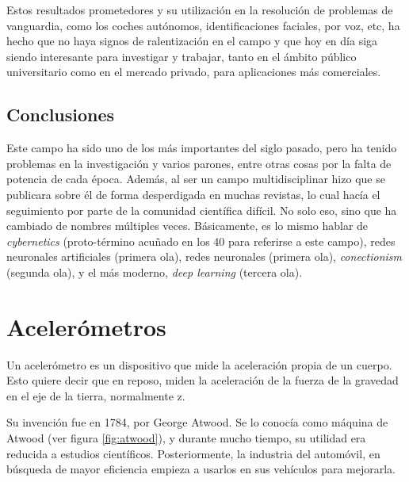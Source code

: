 \documentclass[12pt]{book}
\numberwithin{equation}{section}
\begin{document}
Estos resultados prometedores y su utilización en la resolución de problemas de vanguardia, como los coches autónomos, identificaciones faciales, por voz, etc,  ha hecho que no haya signos de ralentización en el campo y que hoy en día siga siendo interesante para investigar y trabajar, tanto en el ámbito público universitario como en el mercado privado, para aplicaciones más comerciales.


\subsection{Conclusiones}

Este campo ha sido uno de los más importantes del siglo pasado, pero ha tenido problemas en la investigación y varios parones, entre otras cosas por la falta de potencia de cada época. Además, al ser un campo multidisciplinar hizo que se publicara sobre él de forma desperdigada en muchas revistas, lo cual hacía el seguimiento por parte de la comunidad científica difícil. No solo eso, sino que ha cambiado de nombres múltiples veces. Básicamente, es lo mismo hablar de \textit{cybernetics} (proto-término acuñado en los 40 para referirse a este campo), redes neuronales artificiales (primera ola), redes neuronales (primera ola), \textit{conectionism} (segunda ola), y el más moderno, \textit{deep learning} (tercera ola).

\section{Acelerómetros}

Un acelerómetro es un dispositivo que mide la aceleración propia de un cuerpo. Esto quiere decir que en reposo, miden la aceleración de la fuerza de la gravedad en el eje de la tierra, normalmente z.

Su invención fue en 1784, por George Atwood. Se lo conocía como máquina de Atwood (ver figura \ref{fig:atwood}), y durante mucho tiempo, su utilidad era reducida a estudios científicos. Posteriormente, la industria del automóvil, en búsqueda de mayor eficiencia empieza a usarlos en sus vehículos para mejorarla.
\end{document}
